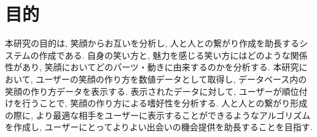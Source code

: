 


\section{目的}
本研究の目的は, 笑顔からお互いを分析し, 人と人との繋がり作成を助長するシステムの作成である.
自身の笑い方と, 魅力を感じる笑い方にはどのような関係性があり, 笑顔においてどのパーツ・動きに由来するのかを分析する.
本研究において, ユーザーの笑顔の作り方を数値データとして取得し,
データベース内の笑顔の作り方データを表示する.
表示されたデータに対して, ユーザーが順位付けを行うことで, 笑顔の作り方による嗜好性を分析する.
人と人との繋がり形成の際に, より最適な相手をユーザーに表示することができるようなアルゴリズムを作成し,
ユーザーにとってよりよい出会いの機会提供を助長することを目指す.


